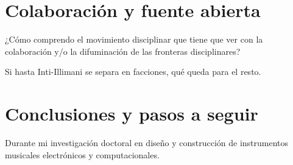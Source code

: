 \documentclass{article}
\begin{document}
\section{Colaboración y fuente abierta}

¿Cómo comprendo el movimiento disciplinar que tiene que ver con la colaboración y/o la difuminación de las fronteras disciplinares?

Si hasta Inti-Illimani se separa en facciones, qué queda para el resto.

\section{Conclusiones y pasos a seguir}

Durante mi investigación doctoral en diseño y construcción de instrumentos musicales electrónicos y computacionales.


\printbibliography[title={Bibliografía}, heading=bibintoc]
\end{document}

